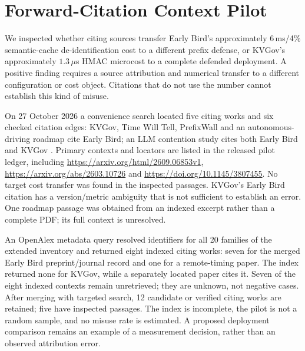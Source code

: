 \section{Forward-Citation Context Pilot}\label{sec:forward-pilot}
We inspected whether citing sources transfer Early Bird's approximately 6\,ms/4\% semantic-cache de-identification cost to a different prefix defense, or KVGov's approximately $1.3\,\mu$s HMAC microcost to a complete defended deployment. A positive finding requires a source attribution and numerical transfer to a different configuration or cost object. Citations that do not use the number cannot establish this kind of misuse.

On 27 October 2026 a convenience search located five citing works and six checked citation edges: KVGov, Time Will Tell, PrefixWall and an autonomous-driving roadmap cite Early Bird; an LLM contention study cites both Early Bird and KVGov \cite{addagada2026kvgov,timewilltell2024}. Primary contexts and locators are listed in the released pilot ledger, including \url{https://arxiv.org/html/2609.06853v1}, \url{https://arxiv.org/abs/2603.10726} and \url{https://doi.org/10.1145/3807455}. No target cost transfer was found in the inspected passages. KVGov's Early Bird citation has a version/metric ambiguity that is not sufficient to establish an error. One roadmap passage was obtained from an indexed excerpt rather than a complete PDF; its full context is unresolved.

An OpenAlex metadata query resolved identifiers for all 20 families of the extended inventory and returned eight indexed citing works: seven for the merged Early Bird preprint/journal record and one for a remote-timing paper. The index returned none for KVGov, while a separately located paper cites it. Seven of the eight indexed contexts remain unretrieved; they are unknown, not negative cases. After merging with targeted search, 12 candidate or verified citing works are retained; five have inspected passages. The index is incomplete, the pilot is not a random sample, and no misuse rate is estimated. A proposed deployment comparison remains an example of a measurement decision, rather than an observed attribution error.
